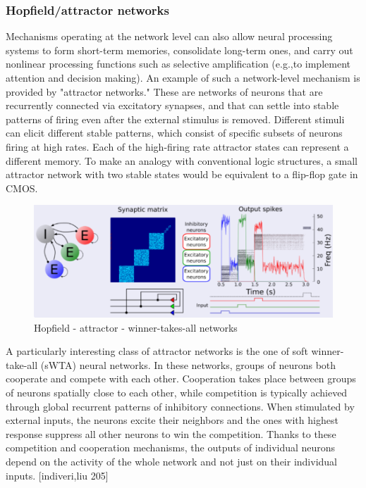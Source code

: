 \documentclass[main]{subfiles}
\begin{document}
\subsubsection*{Hopfield/attractor networks} \label{wta}

Mechanisms operating at the network level can also allow neural processing systems to form short-term memories, consolidate long-term ones, and carry out nonlinear processing functions such as selective amplification (e.g.,to implement attention and decision making). An example of such a network-level mechanism is provided by "attractor networks." These are networks of neurons that are recurrently connected via excitatory synapses, and that can settle into stable patterns of firing even after the external stimulus is removed. Different stimuli can elicit different stable patterns, which consist of specific subsets of neurons firing at high rates. Each of the high-firing rate attractor states can represent a different memory. To make an analogy with conventional logic structures, a small attractor network with two stable states would be equivalent to a flip-flop gate in CMOS. 

%
\begin{figure}[h]
    \centering
    \includegraphics[width=0.8\linewidth]{12_NeuromorphicSystems2/figures/wta.PNG}
    \caption{Hopfield - attractor - winner-takes-all networks}
    \label{fig:wta}
\end{figure}
%

A particularly interesting class of attractor networks is the one of soft winner-take-all (sWTA) neural networks. In these networks, groups of neurons both cooperate and compete with each other. Cooperation takes place between groups of neurons spatially close to each other, while competition is typically achieved through global recurrent patterns of inhibitory connections. When stimulated by external inputs, the neurons excite their neighbors and the ones with highest response suppress all other neurons to win the competition. Thanks to these competition and cooperation mechanisms, the outputs of individual neurons depend on the activity of the whole network and not just on their individual inputs. [indiveri,liu 205]
\end{document}
